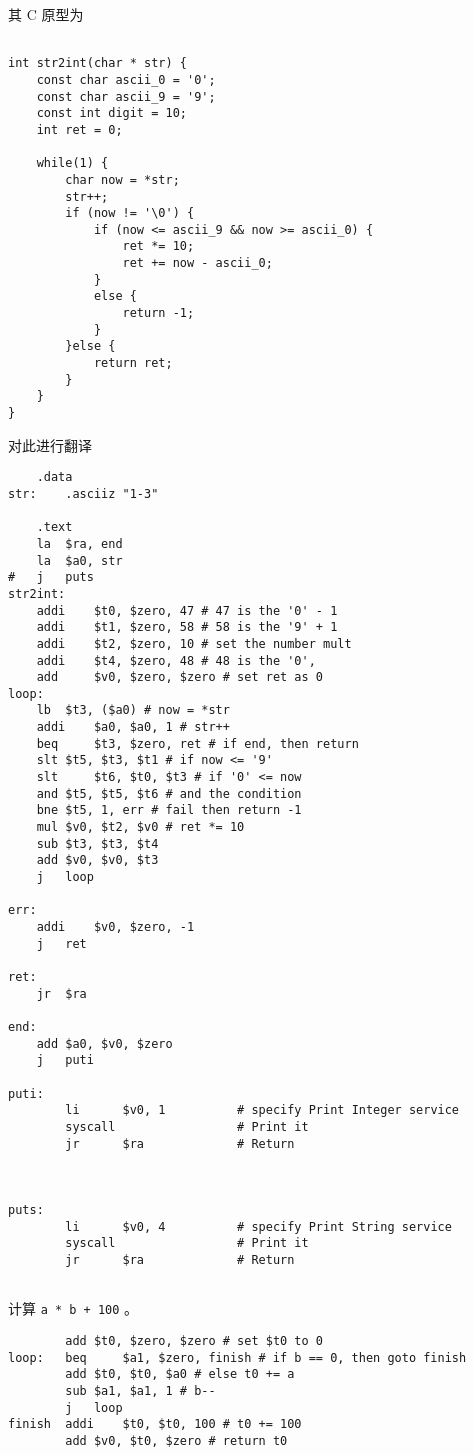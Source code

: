 \documentclass[lang=cn,11pt,a4paper,cite=authoryear]{elegantpaper}
\begin{document}

其 C 原型为 

\begin{lstlisting}

int str2int(char * str) {
    const char ascii_0 = '0';
    const char ascii_9 = '9';
    const int digit = 10;
    int ret = 0;

    while(1) {
		char now = *str;
		str++;
        if (now != '\0') {
            if (now <= ascii_9 && now >= ascii_0) {
                ret *= 10;
                ret += now - ascii_0;
            }
            else {
                return -1;
            }
        }else {
            return ret;
        }
    }
} 

\end{lstlisting}

对此进行翻译

\begin{lstlisting}
	.data
str: 	.asciiz	"1-3"

	.text
	la	$ra, end
	la	$a0, str
#	j 	puts
str2int:
	addi	$t0, $zero, 47 # 47 is the '0' - 1
	addi 	$t1, $zero, 58 # 58 is the '9' + 1
	addi 	$t2, $zero, 10 # set the number mult
	addi	$t4, $zero, 48 # 48 is the '0', 
	add 	$v0, $zero, $zero # set ret as 0
loop:
	lb	$t3, ($a0) # now = *str
	addi	$a0, $a0, 1 # str++
	beq 	$t3, $zero, ret # if end, then return 
	slt	$t5, $t3, $t1 # if now <= '9'
	slt 	$t6, $t0, $t3 # if '0' <= now
	and	$t5, $t5, $t6 # and the condition
	bne	$t5, 1, err # fail then return -1
	mul	$v0, $t2, $v0 # ret *= 10
	sub	$t3, $t3, $t4
	add	$v0, $v0, $t3
	j	loop
	
err:
	addi	$v0, $zero, -1
	j	ret

ret:	
	jr 	$ra
	
end: 	
	add	$a0, $v0, $zero
	j 	puti
	
puti:
        li      $v0, 1          # specify Print Integer service
        syscall                 # Print it
        jr      $ra             # Return



puts:
        li      $v0, 4          # specify Print String service
        syscall                 # Print it
        jr      $ra             # Return


\end{lstlisting}


计算 \lstinline{a * b + 100} 。

\begin{lstlisting}
		add	$t0, $zero, $zero # set $t0 to 0
loop:	beq 	$a1, $zero, finish # if b == 0, then goto finish 
		add	$t0, $t0, $a0 # else t0 += a
		sub	$a1, $a1, 1 # b--
		j 	loop
finish	addi	$t0, $t0, 100 # t0 += 100
		add	$v0, $t0, $zero # return t0
\end{lstlisting}
\end{document}
